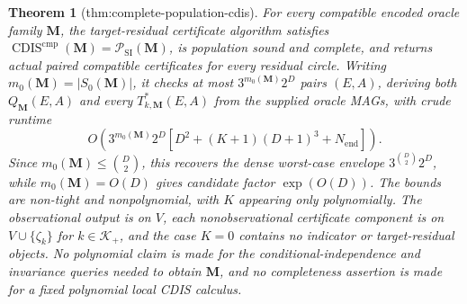 \documentclass{article}
\newtheorem{theorem}{Theorem}
\begin{document}
\begin{theorem}[thm:complete-population-cdis]\label{thm:complete-population-cdis}
For every compatible encoded oracle family \(\mathbf M\), the target-residual certificate algorithm satisfies \(\operatorname{CDIS}^{\mathrm{cmp}}(\mathbf M)=\mathcal P_{\mathrm{SI}}(\mathbf M)\), is population sound and complete, and returns actual paired compatible certificates for every residual circle.  Writing \(m_0(\mathbf M)=|S_0(\mathbf M)|\), it checks at most \(3^{m_0(\mathbf M)}2^D\) pairs \((E,A)\), deriving both \(Q_{\mathbf M}(E,A)\) and every \(T^*_{k,\mathbf M}(E,A)\) from the supplied oracle MAGs, with crude runtime
\[
O\!\left(3^{m_0(\mathbf M)}2^D
\left[D^2+(K+1)(D+1)^3+N_{\mathrm{end}}\right]\right).
\]
Since \(m_0(\mathbf M)\le\binom D2\), this recovers the dense worst-case envelope \(3^{\binom D2}2^D\), while \(m_0(\mathbf M)=O(D)\) gives candidate factor \(\exp(O(D))\).  The bounds are non-tight and nonpolynomial, with \(K\) appearing only polynomially.  The observational output is on \(V\), each nonobservational certificate component is on \(V\cup\{\zeta_k\}\) for \(k\in\mathcal K_+\), and the case \(K=0\) contains no indicator or target-residual objects.  No polynomial claim is made for the conditional-independence and invariance queries needed to obtain \(\mathbf M\), and no completeness assertion is made for a fixed polynomial local CDIS calculus.
\end{theorem}
\end{document}
